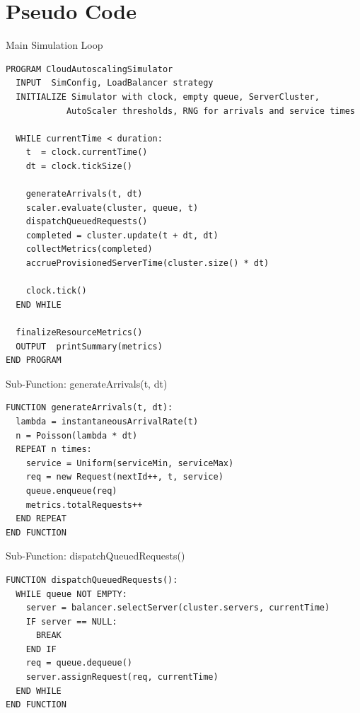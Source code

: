 \documentclass[12pt, a4paper]{article}
\begin{document}
\section{Pseudo Code}

\begin{codebox}{Main Simulation Loop}
\begin{lstlisting}[style=pseudo]
PROGRAM CloudAutoscalingSimulator
  INPUT  SimConfig, LoadBalancer strategy
  INITIALIZE Simulator with clock, empty queue, ServerCluster,
            AutoScaler thresholds, RNG for arrivals and service times

  WHILE currentTime < duration:
    t  = clock.currentTime()
    dt = clock.tickSize()

    generateArrivals(t, dt)
    scaler.evaluate(cluster, queue, t)
    dispatchQueuedRequests()
    completed = cluster.update(t + dt, dt)
    collectMetrics(completed)
    accrueProvisionedServerTime(cluster.size() * dt)

    clock.tick()
  END WHILE

  finalizeResourceMetrics()
  OUTPUT  printSummary(metrics)
END PROGRAM
\end{lstlisting}
\end{codebox}

\begin{codebox}{Sub-Function: generateArrivals(t, dt)}
\begin{lstlisting}[style=pseudo]
FUNCTION generateArrivals(t, dt):
  lambda = instantaneousArrivalRate(t)
  n = Poisson(lambda * dt)
  REPEAT n times:
    service = Uniform(serviceMin, serviceMax)
    req = new Request(nextId++, t, service)
    queue.enqueue(req)
    metrics.totalRequests++
  END REPEAT
END FUNCTION
\end{lstlisting}
\end{codebox}

\begin{codebox}{Sub-Function: dispatchQueuedRequests()}
\begin{lstlisting}[style=pseudo]
FUNCTION dispatchQueuedRequests():
  WHILE queue NOT EMPTY:
    server = balancer.selectServer(cluster.servers, currentTime)
    IF server == NULL:
      BREAK
    END IF
    req = queue.dequeue()
    server.assignRequest(req, currentTime)
  END WHILE
END FUNCTION
\end{lstlisting}
\end{codebox}
\end{document}
